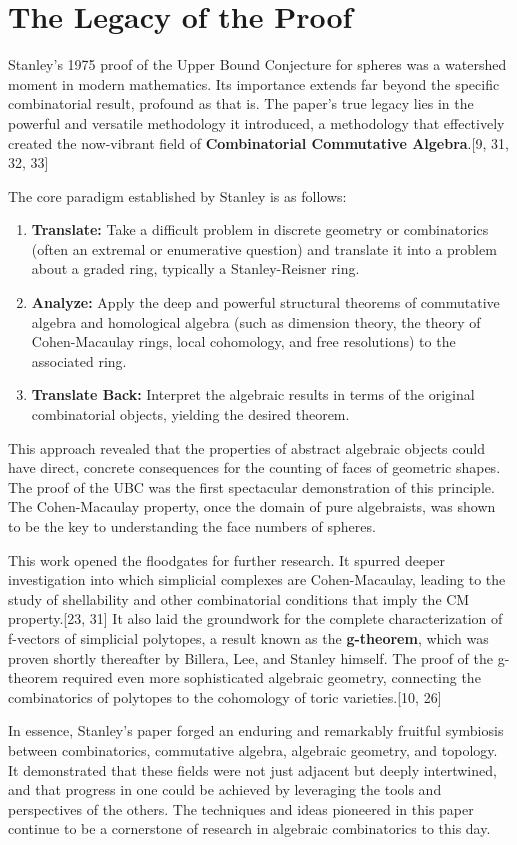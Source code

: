 \documentclass[11pt]{article}
\begin{document}
\section{The Legacy of the Proof}

Stanley's 1975 proof of the Upper Bound Conjecture for spheres was a watershed moment in modern mathematics. Its importance extends far beyond the specific combinatorial result, profound as that is. The paper's true legacy lies in the powerful and versatile methodology it introduced, a methodology that effectively created the now-vibrant field of \textbf{Combinatorial Commutative Algebra}.[9, 31, 32, 33]

The core paradigm established by Stanley is as follows:
\begin{enumerate}
    \item \textbf{Translate:} Take a difficult problem in discrete geometry or combinatorics (often an extremal or enumerative question) and translate it into a problem about a graded ring, typically a Stanley-Reisner ring.
    \item \textbf{Analyze:} Apply the deep and powerful structural theorems of commutative algebra and homological algebra (such as dimension theory, the theory of Cohen-Macaulay rings, local cohomology, and free resolutions) to the associated ring.
    \item \textbf{Translate Back:} Interpret the algebraic results in terms of the original combinatorial objects, yielding the desired theorem.
\end{enumerate}

This approach revealed that the properties of abstract algebraic objects could have direct, concrete consequences for the counting of faces of geometric shapes. The proof of the UBC was the first spectacular demonstration of this principle. The Cohen-Macaulay property, once the domain of pure algebraists, was shown to be the key to understanding the face numbers of spheres.

This work opened the floodgates for further research. It spurred deeper investigation into which simplicial complexes are Cohen-Macaulay, leading to the study of shellability and other combinatorial conditions that imply the CM property.[23, 31] It also laid the groundwork for the complete characterization of f-vectors of simplicial polytopes, a result known as the \textbf{g-theorem}, which was proven shortly thereafter by Billera, Lee, and Stanley himself. The proof of the g-theorem required even more sophisticated algebraic geometry, connecting the combinatorics of polytopes to the cohomology of toric varieties.[10, 26]

In essence, Stanley's paper forged an enduring and remarkably fruitful symbiosis between combinatorics, commutative algebra, algebraic geometry, and topology. It demonstrated that these fields were not just adjacent but deeply intertwined, and that progress in one could be achieved by leveraging the tools and perspectives of the others. The techniques and ideas pioneered in this paper continue to be a cornerstone of research in algebraic combinatorics to this day.
\end{document}
